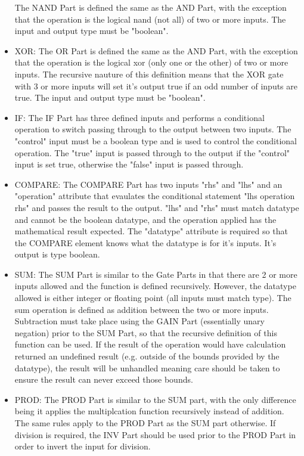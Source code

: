 \begin{itemize}[label={}]
The NAND Part is defined the same as the AND Part, with the exception that the operation is the logical nand (not all) of two or more inputs.
The input and output type must be "boolean".
    \item XOR:
The OR Part is defined the same as the AND Part, with the exception that the operation is the logical xor (only one or the other) of two or more inputs.
The recursive nauture of this definition means that the XOR gate with 3 or more inputs will set it's output true if an odd number of inputs are true.
The input and output type must be "boolean".
    \item IF:
The IF Part has three defined inputs and performs a conditional operation to switch passing through to the output between two inputs.
The "control" input must be a boolean type and is used to control the conditional operation.
The "true" input is passed through to the output if the "control" input is set true, otherwise the "false" input is passed through.
    \item COMPARE:
The COMPARE Part has two inputs "rhs" and "lhs" and an "operation" attribute that evaulates the conditional statement "lhs operation rhs" and passes the result to the output.
"lhs" and "rhs" must match datatype and cannot be the boolean datatype, and the operation applied has the mathematical result expected.
The "datatype" attribute is required so that the COMPARE element knows what the datatype is for it's inputs. It's output is type boolean.
    \item SUM:
The SUM Part is similar to the Gate Parts in that there are 2 or more inputs allowed and the function is defined recursively.
However, the datatype allowed is either integer or floating point (all inputs must match type).
The sum operation is defined as addition between the two or more inputs.
Subtraction must take place using the GAIN Part (essentially unary negation) prior to the SUM Part, so that the recursive definition of this function can be used.
If the result of the operation would have calculation returned an undefined result (e.g. outside of the bounds provided by the datatype), the result will be unhandled meaning care should be taken to ensure the result can never exceed those bounds.
    \item PROD:
The PROD Part is similar to the SUM part, with the only difference being it applies the multiplcation function recursively instead of addition.
The same rules apply to the PROD Part as the SUM part otherwise.
If division is required, the INV Part should be used prior to the PROD Part in order to invert the input for division.

\end{itemize}
